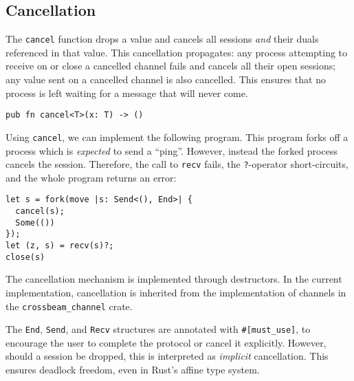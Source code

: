 \documentclass[sigconf,natbib=false]{acmart}
\begin{document}
\subsection{Cancellation}\label{sec:cancellation}
The \lstinline{cancel} function drops a value and cancels all sessions \emph{and} their duals referenced in that value. This cancellation propagates: any process attempting to receive on or close a cancelled channel fails and cancels all their open sessions; any value sent on a cancelled channel is also cancelled. This ensures that no process is left waiting for a message that will never come.
\begin{lstlisting}
pub fn cancel<T>(x: T) -> ()
\end{lstlisting}
Using \lstinline{cancel}, we can implement the following program. This program forks off a process which is \emph{expected} to send a ``ping''. However, instead the forked process cancels the session. Therefore, the call to \lstinline{recv} fails, the \lstinline{?}-operator short-circuits, and the whole program returns an error:
\begin{lstlisting}
let s = fork(move |s: Send<(), End>| {
  cancel(s);
  Some(())
});
let (z, s) = recv(s)?;
close(s)
\end{lstlisting}
The cancellation mechanism is implemented through destructors. In the current implementation, cancellation is inherited from the implementation of channels in the \lstinline{crossbeam_channel} crate.

The \lstinline{End}, \lstinline{Send}, and \lstinline{Recv} structures are annotated with \lstinline{#[must_use]}, to encourage the user to complete the protocol or cancel it explicitly. However, should a session be dropped, this is interpreted as \emph{implicit} cancellation. This ensures deadlock freedom, even in Rust's affine type system.
\end{document}
